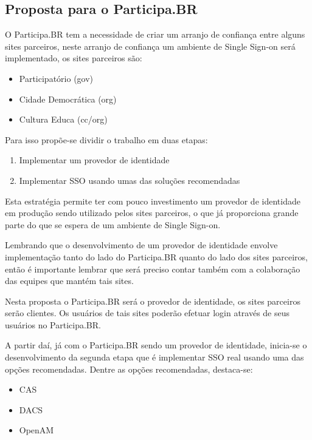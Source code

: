\documentclass[11pt]{article}
\begin{document}
\subsection{Proposta para o Participa.BR}


O Participa.BR tem a necessidade de criar um arranjo de confiança entre alguns
sites parceiros, neste arranjo de confiança um ambiente de Single Sign-on será
implementado, os sites parceiros são:

\begin{itemize}
  \item{Participatório (gov)}
  \item{Cidade Democrática (org)}
  \item{Cultura Educa (cc/org)}
\end{itemize}


Para isso propõe-se dividir o trabalho em duas etapas:

\begin{enumerate}
  \item{Implementar um provedor de identidade}
  \item{Implementar SSO  usando umas das soluções recomendadas}
\end{enumerate}

Esta estratégia permite ter com pouco investimento um provedor de identidade
em produção sendo utilizado pelos sites parceiros, o que já proporciona grande
parte do que se espera de um ambiente de Single Sign-on.

Lembrando que o desenvolvimento de um provedor de identidade envolve
implementação tanto do lado do Participa.BR quanto do lado dos sites
parceiros, então é importante lembrar que será preciso contar também com a
colaboração das equipes que mantém tais sites.

Nesta proposta o Participa.BR será o provedor de identidade, os sites
parceiros serão clientes. Os usuários de tais sites poderão efetuar login
através de seus usuários no Participa.BR.

A partir daí, já com o Participa.BR sendo um provedor de identidade, inicia-se
o desenvolvimento da segunda etapa que é implementar SSO real usando uma das
opções recomendadas. Dentre as opções recomendadas, destaca-se:

\begin{itemize}
  \item{CAS}
  \item{DACS}
  \item{OpenAM}
\end{itemize}
\end{document}
